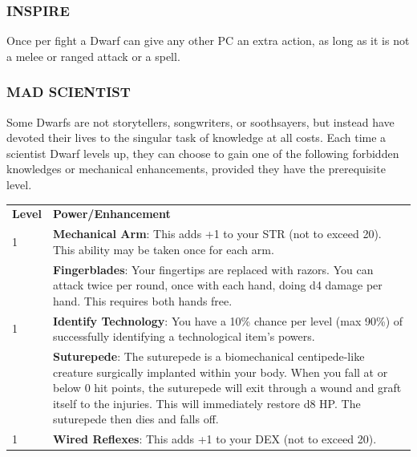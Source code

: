 \documentclass[twoside]{article}
\begin{document}
\subsubsection*{\footnotesize{I}\scriptsize{NSPIRE}\normalsize}

Once per fight a Dwarf can give any other PC an extra action, as long as it is not a melee or ranged attack or a spell. 

\subsubsection*{\footnotesize{M}\scriptsize{AD} \footnotesize{S}\scriptsize{CIENTIST}\normalsize}

Some Dwarfs are not storytellers, songwriters, or soothsayers, but instead have devoted their lives to the singular task of knowledge at all costs. Each time a scientist Dwarf levels up, they can choose to gain one of the following forbidden knowledges or mechanical enhancements, provided they have the prerequisite level.

\bigbreak

\begin{center}
\noindent\begin{tabular}{>{\centering\arraybackslash}p{}p{}}
\textbf{Level}&\textbf{Power/Enhancement}\\
\rowcolor[gray]{0.75}1&\textbf{Mechanical Arm}: This adds +1 to your STR (not to exceed 20). This ability may be taken once for each arm.\\
1&\textbf{Fingerblades}: Your fingertips are replaced with razors. You can attack twice per round, once with each hand, doing d4 damage per hand. This requires both hands free.\\
\rowcolor[gray]{0.75}1&\textbf{Identify Technology}: You have a 10\% chance per level (max 90\%) of successfully identifying a technological item’s powers.\\
1&\textbf{Suturepede}: The suturepede is a biomechanical centipede-like creature surgically implanted within your body. When you fall at or below 0 hit points, the suturepede will exit through a wound and graft itself to the injuries. This will immediately restore d8 HP. The suturepede then dies and falls off.\\
\rowcolor[gray]{0.75}1&\textbf{Wired Reflexes}: This adds +1 to your DEX (not to exceed 20).\\
\end{tabular}
\end{center}
\end{document}
